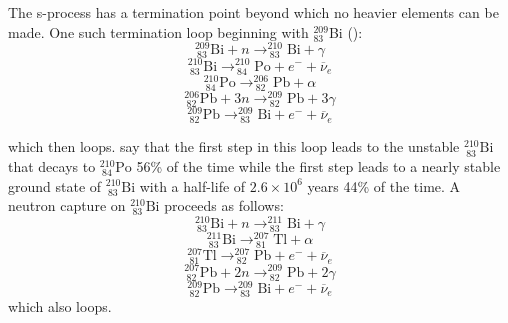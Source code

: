 The s-process has a termination point beyond which no heavier elements
can be made.  One such termination loop beginning with $^{209}_{83}$Bi
(\citealt{claytonetal1961}):
\begin{equation*}
^{209}_{\ 83}\textrm{Bi} + n  \rightarrow ^{210}_{\ 83}\textrm{Bi} +
\gamma 
\end{equation*}
\begin{equation*}
^{210}_{\ 83}\textrm{Bi}   \rightarrow ^{210}_{\ 84}\textrm{Po} +
e^- + \overline{\nu}_e 
\end{equation*}
\begin{equation*}
^{210}_{\ 84}\textrm{Po}   \rightarrow ^{206}_{\ 82}\textrm{Pb} +
\alpha 
\end{equation*}
\begin{equation*}
^{206}_{\ 82}\textrm{Pb} + 3n  \rightarrow ^{209}_{\ 82}\textrm{Pb} +
3\gamma 
\end{equation*}
\begin{equation}
\label{eq:firsttermination}
^{209}_{\ 82}\textrm{Pb}  \rightarrow ^{209}_{\ 83}\textrm{Bi} + e^-
+ \overline{\nu}_e
\end{equation}

which then loops.  \cite{claytonetal1961} say that the first step in this loop leads to the unstable $^{210}_{\ 83}\textrm{Bi}$ that decays
to $^{210}_{\ 84}\textrm{Po}$ 56\% of the time while the first step leads to a
nearly stable ground state of $^{210}_{\ 83}\textrm{Bi}$ with a
half-life of $2.6 \times 10^6$ years 44\% of the time.  A neutron capture
on $^{210}_{\ 83}\textrm{Bi}$ proceeds as follows:
\begin{equation*}
^{210}_{\ 83}\textrm{Bi} + n  \rightarrow ^{211}_{\ 83}\textrm{Bi} +
\gamma
\end{equation*}
\begin{equation*}
^{211}_{\ 83}\textrm{Bi}  \rightarrow ^{207}_{\ 81}\textrm{Tl} + \alpha
\end{equation*}
\begin{equation*}
 ^{207}_{\ 81}\textrm{Tl}  \rightarrow  ^{207}_{\ 82}\textrm{Pb} + e^-
 + \overline{\nu}_e
\end{equation*}
\begin{equation*}
^{207}_{\ 82}\textrm{Pb} + 2n  \rightarrow ^{209}_{\ 82}\textrm{Pb} +
2\gamma
\end{equation*}
\begin{equation}
\label{eq:secondtermination}
^{209}_{\ 82}\textrm{Pb}  \rightarrow ^{209}_{\ 83}\textrm{Bi} + e^- + \overline{\nu}_e
\end{equation}
which also loops.


